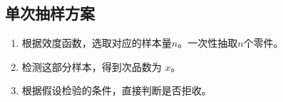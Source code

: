 \documentclass{article}
\begin{document}
	
	
	
	
	
	
	
	\subsection*{单次抽样方案}
	
	\begin{enumerate}
		\item 根据效度函数，选取对应的样本量$n$。一次性抽取$n$个零件。
		\item 检测这部分样本，得到次品数为 $x$。
		\item 根据假设检验的条件，直接判断是否拒收。
	\end{enumerate}
	
\end{document}
